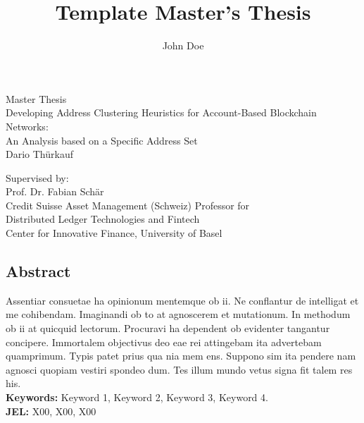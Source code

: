 \documentclass[12pt,a4paper,titlepage,oneside,english]{article}
\title{Template Master's Thesis}
\author{John Doe}
\begin{document}
\begin{center}
\vspace{1em}
\large{Master Thesis}\\
\huge Developing Address Clustering Heuristics for Account-Based Blockchain Networks:\\ An Analysis based on a Specific Address Set \\
\Large \vspace{1em}
Dario Thürkauf
\end{center}

\vspace{1em}
\normalsize
\begin{flushleft}
Supervised by:\\ 
Prof. Dr. Fabian Schär \\
Credit Suisse Asset Management (Schweiz) Professor for \\ 
Distributed Ledger Technologies and Fintech \\
Center for Innovative Finance, University of Basel
\end{flushleft}

\vspace{1em}
\onehalfspacing
\begin{center}
\section*{Abstract}
\end{center}
Assentiar consuetae ha opinionum mentemque ob ii. Ne conflantur de intelligat et me cohibendam. Imaginandi ob to at agnoscerem et mutationum. In methodum ob ii at quicquid lectorum. Procuravi ha dependent ob evidenter tangantur concipere. Immortalem objectivus deo eae rei attingebam ita advertebam quamprimum. Typis patet prius qua nia mem ens. Suppono sim ita pendere nam agnosci quopiam vestiri spondeo dum. Tes illum mundo vetus signa fit talem res his.  \\
\vfill
\textbf{Keywords:} Keyword 1, Keyword 2, Keyword 3, Keyword 4.\\
\noindent\textbf{JEL:} X00, X00, X00




\newpage
{}
\tableofcontents

\vfill
\begin{center}
\end{center}
\newpage
\singlespacing
\end{document}
